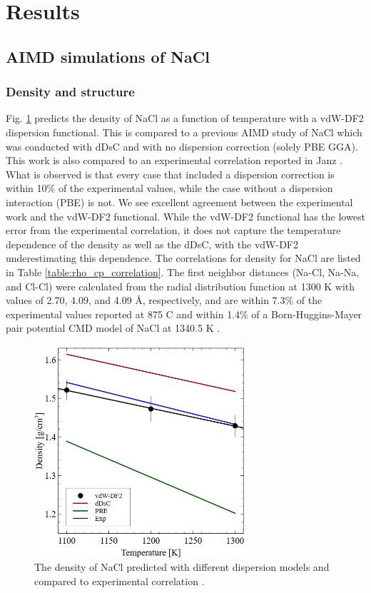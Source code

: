 \documentclass[review]{elsarticle}
\begin{document}
\section{Results}

\subsection{AIMD simulations of NaCl}
\subsubsection{Density and structure}

Fig. \ref{fig:NaCl_density} predicts the density of NaCl as a function of temperature with a vdW-DF2 dispersion functional. This is compared to a previous AIMD study of NaCl \cite{ANDERSSON2022153836} which was conducted with dDsC and with no dispersion correction (solely PBE GGA). This work is also compared to an experimental correlation reported in Janz \cite{janz1988thermodynamic}. What is observed is that every case that included a dispersion correction is within 10\% of the experimental values, while the case without a dispersion interaction (PBE) is not. We see excellent agreement between the experimental work and the vdW-DF2 functional. While the vdW-DF2 functional has the lowest error from the experimental correlation, it does not capture the temperature dependence of the density as well as the dDsC, with the vdW-DF2 underestimating this dependence. The correlations for density for NaCl are listed in Table \ref{table:rho_cp_correlation}. The first neighbor distances (Na-Cl, Na-Na, and Cl-Cl) were calculated from the radial distribution function at 1300 K with values of 2.70, 4.09, and 4.09 {\AA}, respectively, and are within 7.3\% of the experimental values reported at 875 \degree C \cite{edwards1975structure} and within 1.4\% of a Born-Huggins-Mayer pair potential  CMD model of NaCl at 1340.5 K \cite{lantelme1974application}. 

\begin{figure}[h!]
 \centering
 \includegraphics[width=0.7\textwidth]{NaCl-density.jpg} 
 \caption{The density of NaCl predicted with different dispersion models\cite{ANDERSSON2022153836} and compared to experimental correlation \cite{janz1988thermodynamic}.}
 \label{fig:NaCl_density}
\end{figure}
\end{document}
